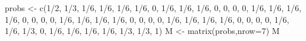 \documentclass[
]{article}
\newenvironment{Shaded}{\begin{snugshade}}{\end{snugshade}}
\newcommand{\AttributeTok}[1]{\textcolor[rgb]{0.77,0.63,0.00}{#1}}
\newcommand{\DecValTok}[1]{\textcolor[rgb]{0.00,0.00,0.81}{#1}}
\newcommand{\FunctionTok}[1]{\textcolor[rgb]{0.00,0.00,0.00}{#1}}
\newcommand{\NormalTok}[1]{#1}
\newcommand{\OtherTok}[1]{\textcolor[rgb]{0.56,0.35,0.01}{#1}}
\newcommand{\SpecialCharTok}[1]{\textcolor[rgb]{0.00,0.00,0.00}{#1}}
\begin{document}
\begin{Shaded}
\begin{Highlighting}[]
\NormalTok{probs }\OtherTok{\textless{}{-}} \FunctionTok{c}\NormalTok{(}\DecValTok{1}\SpecialCharTok{/}\DecValTok{2}\NormalTok{,  }\DecValTok{1}\SpecialCharTok{/}\DecValTok{3}\NormalTok{, }\DecValTok{1}\SpecialCharTok{/}\DecValTok{6}\NormalTok{, }\DecValTok{1}\SpecialCharTok{/}\DecValTok{6}\NormalTok{, }\DecValTok{1}\SpecialCharTok{/}\DecValTok{6}\NormalTok{, }\DecValTok{1}\SpecialCharTok{/}\DecValTok{6}\NormalTok{, }\DecValTok{0}\NormalTok{,}
            \DecValTok{1}\SpecialCharTok{/}\DecValTok{6}\NormalTok{, }\DecValTok{1}\SpecialCharTok{/}\DecValTok{6}\NormalTok{, }\DecValTok{1}\SpecialCharTok{/}\DecValTok{6}\NormalTok{, }\DecValTok{0}\NormalTok{,   }\DecValTok{0}\NormalTok{,   }\DecValTok{0}\NormalTok{,   }\DecValTok{0}\NormalTok{,}
            \DecValTok{1}\SpecialCharTok{/}\DecValTok{6}\NormalTok{, }\DecValTok{1}\SpecialCharTok{/}\DecValTok{6}\NormalTok{, }\DecValTok{1}\SpecialCharTok{/}\DecValTok{6}\NormalTok{, }\DecValTok{1}\SpecialCharTok{/}\DecValTok{6}\NormalTok{, }\DecValTok{0}\NormalTok{,   }\DecValTok{0}\NormalTok{,   }\DecValTok{0}\NormalTok{,}
            \DecValTok{0}\NormalTok{,   }\DecValTok{1}\SpecialCharTok{/}\DecValTok{6}\NormalTok{, }\DecValTok{1}\SpecialCharTok{/}\DecValTok{6}\NormalTok{, }\DecValTok{1}\SpecialCharTok{/}\DecValTok{6}\NormalTok{, }\DecValTok{1}\SpecialCharTok{/}\DecValTok{6}\NormalTok{, }\DecValTok{0}\NormalTok{,   }\DecValTok{0}\NormalTok{,}
            \DecValTok{0}\NormalTok{,   }\DecValTok{0}\NormalTok{,   }\DecValTok{1}\SpecialCharTok{/}\DecValTok{6}\NormalTok{, }\DecValTok{1}\SpecialCharTok{/}\DecValTok{6}\NormalTok{, }\DecValTok{1}\SpecialCharTok{/}\DecValTok{6}\NormalTok{, }\DecValTok{1}\SpecialCharTok{/}\DecValTok{6}\NormalTok{, }\DecValTok{0}\NormalTok{,}
            \DecValTok{0}\NormalTok{,   }\DecValTok{0}\NormalTok{,   }\DecValTok{0}\NormalTok{,   }\DecValTok{1}\SpecialCharTok{/}\DecValTok{6}\NormalTok{, }\DecValTok{1}\SpecialCharTok{/}\DecValTok{6}\NormalTok{, }\DecValTok{1}\SpecialCharTok{/}\DecValTok{3}\NormalTok{, }\DecValTok{0}\NormalTok{,}
            \DecValTok{1}\SpecialCharTok{/}\DecValTok{6}\NormalTok{, }\DecValTok{1}\SpecialCharTok{/}\DecValTok{6}\NormalTok{, }\DecValTok{1}\SpecialCharTok{/}\DecValTok{6}\NormalTok{, }\DecValTok{1}\SpecialCharTok{/}\DecValTok{6}\NormalTok{, }\DecValTok{1}\SpecialCharTok{/}\DecValTok{3}\NormalTok{, }\DecValTok{1}\SpecialCharTok{/}\DecValTok{3}\NormalTok{, }\DecValTok{1}\NormalTok{)}
\NormalTok{M }\OtherTok{\textless{}{-}} \FunctionTok{matrix}\NormalTok{(probs,}\AttributeTok{nrow=}\DecValTok{7}\NormalTok{)}
\NormalTok{M}
\end{Highlighting}
\end{Shaded}
\end{document}
